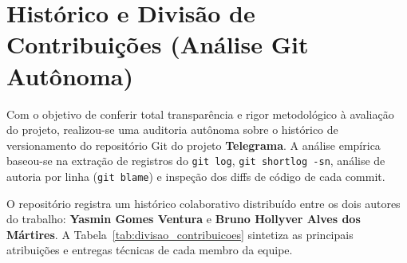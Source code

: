 \documentclass[12pt,a4paper]{report}
\begin{document}
\chapter{Histórico e Divisão de Contribuições (Análise Git Autônoma)}

Com o objetivo de conferir total transparência e rigor metodológico à avaliação do projeto, realizou-se uma auditoria autônoma sobre o histórico de versionamento do repositório Git do projeto \textbf{Telegrama}. A análise empírica baseou-se na extração de registros do \texttt{git log}, \texttt{git shortlog -sn}, análise de autoria por linha (\texttt{git blame}) e inspeção dos diffs de código de cada commit.

O repositório registra um histórico colaborativo distribuído entre os dois autores do trabalho: \textbf{Yasmin Gomes Ventura} e \textbf{Bruno Hollyver Alves dos Mártires}. A Tabela~\ref{tab:divisao_contribuicoes} sintetiza as principais atribuições e entregas técnicas de cada membro da equipe.
\end{document}

